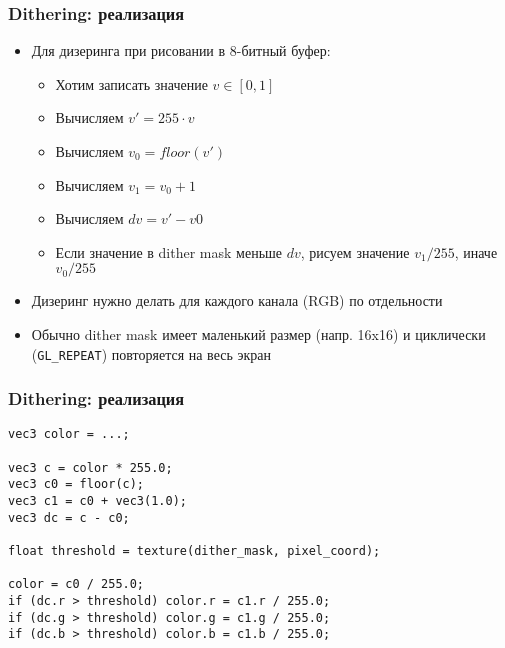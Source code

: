 \documentclass{beamer}
\begin{document}
\begin{frame}[fragile]
\frametitle{Dithering: реализация}
\begin{itemize}
\item Для дизеринга при рисовании в 8-битный буфер:
\begin{itemize}
\item Хотим записать значение \begin{math}v \in [0, 1]\end{math}
\item Вычисляем \begin{math}v' = 255 \cdot v\end{math}
\item Вычисляем \begin{math}v_0 = floor(v')\end{math}
\item Вычисляем \begin{math}v_1 = v_0 + 1\end{math}
\item Вычисляем \begin{math}dv = v' - v0\end{math}
\item Если значение в dither mask меньше \begin{math}dv\end{math}, рисуем значение \begin{math}v_1 / 255\end{math}, иначе \begin{math}v_0 / 255\end{math}
\end{itemize}
\pause
\item Дизеринг нужно делать для каждого канала (RGB) по отдельности
\pause
\item Обычно dither mask имеет маленький размер (напр. 16x16) и циклически (\verb|GL_REPEAT|) повторяется на весь экран
\end{itemize}
\end{frame}

\begin{frame}[fragile]
\fontsize{10pt}{10pt}
\frametitle{Dithering: реализация}
\begin{verbatim}
vec3 color = ...;

vec3 c = color * 255.0;
vec3 c0 = floor(c);
vec3 c1 = c0 + vec3(1.0);
vec3 dc = c - c0;

float threshold = texture(dither_mask, pixel_coord);

color = c0 / 255.0;
if (dc.r > threshold) color.r = c1.r / 255.0;
if (dc.g > threshold) color.g = c1.g / 255.0;
if (dc.b > threshold) color.b = c1.b / 255.0;
\end{verbatim}
\end{frame}
\end{document}
